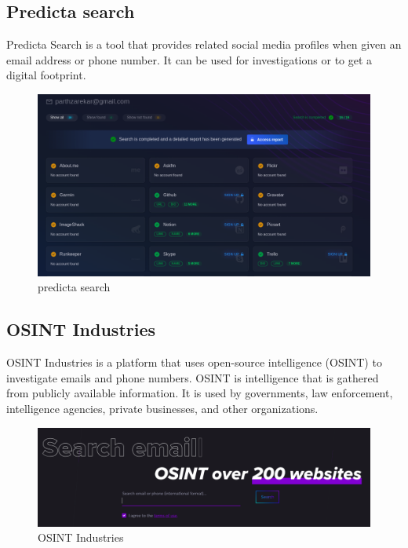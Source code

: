\documentclass[openany]{report}
\begin{document}
\subsection{Predicta search}
Predicta Search is a tool that provides related social media profiles when given an email address or phone number. It can be used for investigations or to get a digital footprint.
\begin{figure}[H]
    \centering
    \includegraphics[width=.95\textwidth]{./imgs/3.png}
    \caption{predicta search}
\end{figure}

\subsection{OSINT Industries}
OSINT Industries is a platform that uses open-source intelligence (OSINT) to investigate emails and phone numbers. OSINT is intelligence that is gathered from publicly available information. It is used by governments, law enforcement, intelligence agencies, private businesses, and other organizations.

\begin{figure}[H]
    \centering
    \includegraphics[width=.95\textwidth]{./imgs/4.png}
    \caption{OSINT Industries}
\end{figure}
\end{document}
